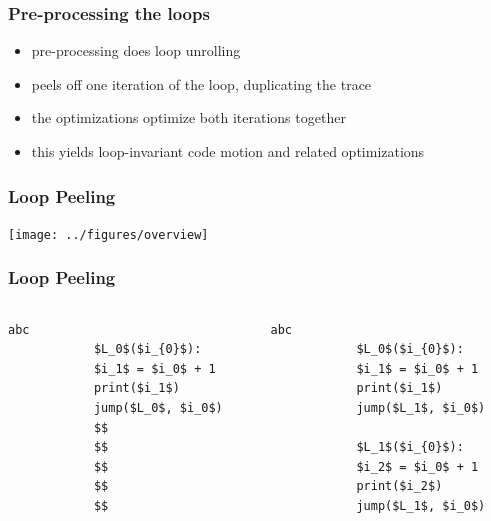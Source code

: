 \documentclass[utf8x]{beamer}
\begin{document}
\begin{frame}
  \frametitle{Pre-processing the loops}
  \begin{itemize}
      \item pre-processing does loop unrolling
      \item peels off one iteration of the loop, duplicating the trace
      \item the optimizations optimize both iterations together
      \item this yields loop-invariant code motion and related optimizations
  \end{itemize}
\end{frame}

\begin{frame}
  \frametitle{Loop Peeling}
\begin{center}
\texttt{[image: ../figures/overview]}
\end{center}
\end{frame}


\begin{frame}[fragile]
  \frametitle{Loop Peeling}
    \begin{columns}
    \begin{column}{0.5\textwidth}
      \centering
            \begin{lstlisting}[mathescape]%,numbers = right,basicstyle=\setstretch{1.05}\ttfamily\scriptsize]
            abc
            $L_0$($i_{0}$):
            $i_1$ = $i_0$ + 1
            print($i_1$)
            jump($L_0$, $i_0$)
            $$
            $$
            $$
            $$
            $$
            \end{lstlisting}
    \end{column}
    \pause
    \begin{column}{0.5\textwidth}
      \centering
            \begin{lstlisting}[mathescape]%,numbers = right,basicstyle=\setstretch{1.05}\ttfamily\scriptsize]
            abc
            $L_0$($i_{0}$):
            $i_1$ = $i_0$ + 1
            print($i_1$)
            jump($L_1$, $i_0$)

            $L_1$($i_{0}$):
            $i_2$ = $i_0$ + 1
            print($i_2$)
            jump($L_1$, $i_0$)
            \end{lstlisting}
    \end{column}
  \end{columns}
\end{frame}
\end{document}
